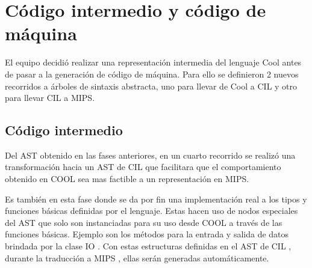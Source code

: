 \documentclass[a4paper,10pt,twocolumn]{article}
\begin{document}
\section{Código intermedio y código de máquina}

El equipo decidió realizar una representación intermedia del lenguaje Cool antes de pasar a la generación de código de máquina. Para ello se definieron 2 nuevos recorridos a árboles de sintaxis abstracta, uno para llevar de Cool a CIL y otro para llevar CIL a MIPS.

\subsection{Código intermedio}
	
 Del AST obtenido en las fases anteriores, en un cuarto recorrido se realizó una transformación hacia un AST de  CIL  que facilitara que el comportamiento obtenido en  COOL  sea mas factible a un representación en MIPS.


 Es también en esta fase donde se da por fin una implementación real a los tipos y
 funciones básicas definidas por el lenguaje. Estas hacen uso de nodos especiales
 del AST que solo son instanciadas para su uso desde  COOL a través de las funciones
 básicas. Ejemplo son los métodos para la entrada y salida de datos brindada por la
 clase  IO . Con estas estructuras definidas en el AST de  CIL , durante la traducción a
 MIPS , ellas serán generadas automáticamente.
 
\end{document}
